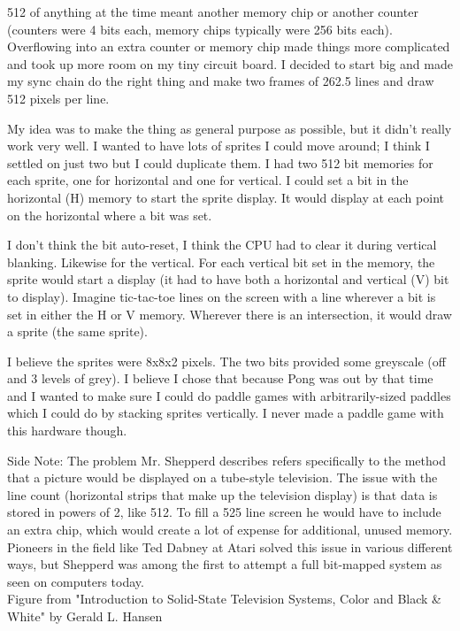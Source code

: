512 of anything at the time meant another memory chip or another counter (counters were 4 bits each, memory chips typically were 256 bits each). Overflowing into an extra counter or memory chip made things more complicated and took up more room on my tiny circuit board. I decided to start big and made my sync chain do the right thing and make two frames of 262.5 lines and draw 512 pixels per line. 

My idea was to make the thing as general purpose as possible, but it didn't really work very well. I wanted to have lots of sprites I could move around; I think I settled on just two but I could duplicate them. I had two 512 bit memories for each sprite, one for horizontal and one for vertical. I could set a bit in the horizontal (H) memory to start the sprite display. It would display at each point on the horizontal where a bit was set. 

I don't think the bit auto-reset, I think the CPU had to clear it during vertical blanking. Likewise for the vertical. For each vertical bit set in the memory, the sprite would start a display (it had to have both a horizontal and vertical (V) bit to display). Imagine tic-tac-toe lines on the screen with a line wherever a bit is set in either the H or V memory. Wherever there is an intersection, it would draw a sprite (the same sprite).

I believe the sprites were 8x8x2 pixels. The two bits provided some greyscale (off and 3 levels of grey). I believe I chose that because Pong was out by that time and I wanted to make sure I could do paddle games with arbitrarily-sized paddles which I could do by stacking sprites vertically. I never made a paddle game with this hardware though. 

\begin{tcolorbox}[]
        {
        Side Note: The problem Mr. Shepperd describes refers specifically to the method that a picture would be displayed on a tube-style television. The issue with the line count (horizontal strips that make up the television display) is that data is stored in powers of 2, like 512. To fill a 525 line screen he would have to include an extra chip, which would create a lot of expense for additional, unused memory. Pioneers in the field like Ted Dabney at Atari solved this issue in various different ways, but Shepperd was among the first to attempt a full bit-mapped system as seen on computers today.\\ Figure from "Introduction to Solid-State Television Systems, Color and Black \& White" by Gerald L. Hansen}
\end{tcolorbox} 

